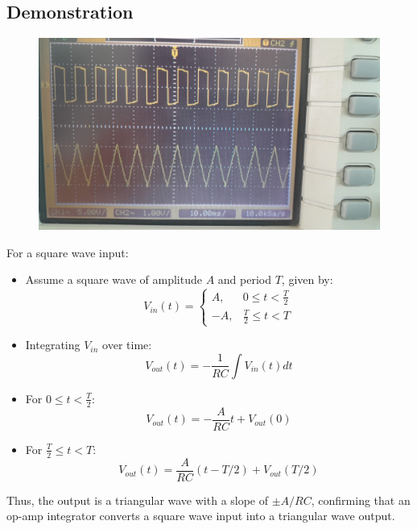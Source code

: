 \documentclass[a4paper,12pt]{article}
\begin{document}
\subsection{Demonstration}
\begin{figure}[H]
	\includegraphics[width=\columnwidth]{figs/integrator.jpg}
\end{figure}
For a square wave input:
\begin{itemize}
    \item Assume a square wave of amplitude \( A \) and period \( T \), given by:
    \begin{equation}
        V_{in}(t) = \begin{cases} A, & 0 \leq t < \frac{T}{2} \\
        -A, & \frac{T}{2} \leq t < T \end{cases}
    \end{equation}
    \item Integrating \( V_{in} \) over time:
    \begin{equation}
        V_{out}(t) = -\frac{1}{RC} \int V_{in}(t) dt
    \end{equation}
    \item For \( 0 \leq t < \frac{T}{2} \):
    \begin{equation}
        V_{out}(t) = -\frac{A}{RC} t + V_{out}(0)
    \end{equation}
    \item For \( \frac{T}{2} \leq t < T \):
    \begin{equation}
        V_{out}(t) = \frac{A}{RC} (t - T/2) + V_{out}(T/2)
    \end{equation}
\end{itemize}
Thus, the output is a triangular wave with a slope of \( \pm A/RC \), confirming that an op-amp integrator converts a square wave input into a triangular wave output.
\end{document}
